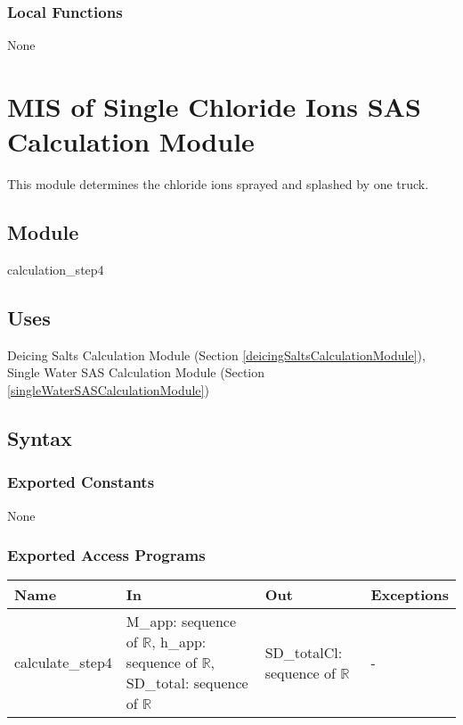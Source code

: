 \documentclass[12pt, titlepage]{article}
\begin{document}
\subsubsection{Local Functions}
None
\newpage


\section{MIS of Single Chloride Ions SAS Calculation Module} \label{singleChlorideIonsSASCalculation Module}
This module determines the chloride ions sprayed and splashed by one truck.

\subsection{Module}
calculation\_step4

\subsection{Uses}

Deicing Salts Calculation Module (Section \ref{deicingSaltsCalculationModule}), Single Water SAS Calculation Module (Section \ref{singleWaterSASCalculationModule})


\subsection{Syntax}

\subsubsection{Exported Constants}
None
\subsubsection{Exported Access Programs}

\begin{center}
\begin{tabular}{p{2.5cm} p{4.5cm} p{5cm} p{2cm}}
\hline
\textbf{Name} & \textbf{In} & \textbf{Out} & \textbf{Exceptions} \\
\hline
calculate\_step4 & M\_app: sequence of $\mathbb{R}$, h\_app: sequence of $\mathbb{R}$, SD\_total: sequence of $\mathbb{R}$ & SD\_totalCl: sequence of $\mathbb{R}$ & - \\

\hline
\end{tabular}
\end{center}
\end{document}
